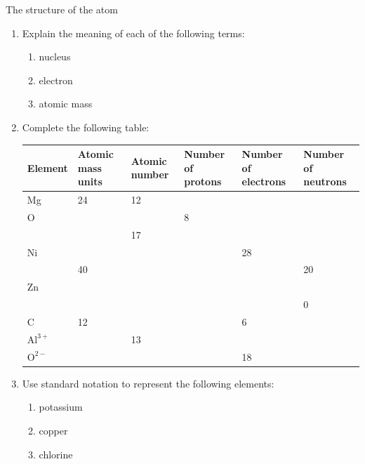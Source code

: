 \begin{exercises}{The structure of the atom} \noindent
      \label{m38745*id256225}\begin{enumerate}[noitemsep, label=\textbf{\arabic*}. ] 
            \label{m38745*uid15}\item Explain the meaning of each of the following terms:
\label{m38745*id256240}\begin{enumerate}[noitemsep, label=\textbf{\alph*}. ] 
            \label{m38745*uid16}\item nucleus
\label{m38745*uid17}\item electron
\label{m38745*uid18}\item atomic mass
\end{enumerate}
                \label{m38745*uid19}\item Complete the following table:
\begin{center} 
\begin{tabular}{|p{1.4cm}|p{1.4cm}|p{1.4cm}|p{1.4cm}|p{1.4cm}|p{1.4cm}|}\hline
\textbf{Element} & \textbf{Atomic mass units} & \textbf{Atomic number} & \textbf{Number of protons} & \textbf{Number of electrons} & \textbf{Number of neutrons}\\\hline
Mg & 24 & 12 & & & \\\hline
O & & & 8 & & \\\hline
 & & 17 & & & \\\hline
Ni & & & & 28 & \\\hline
 & 40 & & & & 20 \\\hline
Zn & & & & & \\\hline
 & & & & & 0 \\\hline
C & 12 & & & 6 & \\\hline 
$\text{Al}^{3+}$ &  & 13 & & &  \\ \hline
$\text{O}^{2-}$ & & & & 18 &  \\ \hline
\end{tabular}
\end{center}
    \par
          \label{m38745*uid20}\item Use standard notation to represent the following elements:
\label{m38745*id256772}\begin{enumerate}[noitemsep, label=\textbf{\alph*}. ] 
            \label{m38745*uid21}\item potassium
\label{m38745*uid22}\item copper
\label{m38745*uid23}\item chlorine

\end{enumerate}
\end{enumerate}
\end{exercises}
